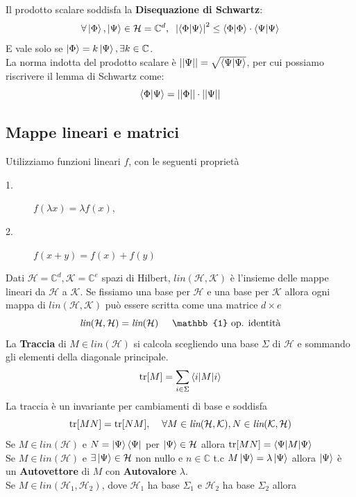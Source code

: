 \documentclass{report}
\begin{document}
 Il prodotto scalare soddisfa la \textbf{Disequazione di Schwartz}:
 $$\forall \ket{\Phi},\ket{\Psi} \in \mathcal{H} = \mathbb{C}^d, \hspace{0.2cm} \left|\braket{\Phi|\Psi} \right|^2 \le \braket{\Phi|\Phi} \cdot \braket{\Psi|\Psi}$$
 E vale solo se $\ket{\Phi} = k\ket{\Psi}, \exists k \in\mathbb{C}$.
 \\La norma indotta del prodotto scalare è $\left| \left| \Psi\right| \right| = \sqrt{\braket{\Psi|\Psi}}$, per cui possiamo riscrivere il lemma di Schwartz come:
 $$\braket{\Phi|\Psi} = \left| \left|\Phi \right| \right| \cdot \left| \left|\Psi \right| \right|$$
 \subsection{Mappe lineari e matrici}
Utilizziamo funzioni lineari $f$, con le seguenti proprietà
\begin{description}
    \item[1.] $f(\lambda x) = \lambda f(x)$,
    \item[2.] $f(x+y) = f(x) + f(y)$ 
\end{description}
Dati $\mathcal{H}= \mathbb{C}^d, \mathcal{K} = \mathbb{C}^e$ spazi di Hilbert, $\textit{lin}(\mathcal{H},\mathcal{K})$ è l'insieme delle mappe lineari da $\mathcal{H}$ a $\mathcal{K}$. Se fissiamo una base per $\mathcal{H}$ e una base per $\mathcal{K}$ allora ogni mappa di $\textit{lin}(\mathcal{H},\mathcal{K})$ può essere scritta come una matrice $d\times e$
$$\textit{lin}(\mathcal{H},\mathcal{H}) = \textit{lin}(\mathcal{H}) \hspace{0.5cm} \mathbb{1} \text{ op. identità}$$
La \textbf{Traccia} di $M \in \textit{lin}(\mathcal{H})$ si calcola scegliendo una base $\Sigma$ di $\mathcal{H}$ e sommando gli elementi della diagonale principale.
$$\text{tr}[M] = \sum_{i \in \Sigma} \braket{i|M|i}$$
La traccia  è un invariante  per cambiamenti di base e soddisfa 
$$\text{tr}[MN] = \text{tr}[NM],\hspace{0.4cm} \forall M\in \textit{lin}(\mathcal{H,K}),N\in \textit{lin}(\mathcal{K,H})$$
Se $M\in \textit{lin}(\mathcal{H})$ e $N = \ket{\Psi}\bra{\Psi}$ per $\ket{\Psi}\in \mathcal{H}$ allora 
$\text{tr}[MN]=\braket{\Psi|M|\Psi}$
\\Se $M\in \textit{lin}(\mathcal{H})$ e $\exists\ket{\Psi}\in \mathcal{H}$ non nullo e $n \in \mathbb{C}$ t.c $M \ket{\Psi} = \lambda \ket{\Psi}$ allora $\ket{\Psi}$ è un \textbf{Autovettore} di $M$ con \textbf{Autovalore} $\lambda$.
\\Se $M\in \textit{lin}(\mathcal{H}_1,\mathcal{H}_2)$, dove $\mathcal{H}_1$ ha base $\Sigma_1$ e  $\mathcal{H}_2$ ha base $\Sigma_2$ allora 
\end{document}
